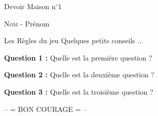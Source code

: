 \documentclass[utf8,a4paper,french,12pt,fleqn]{article}
\newenvironment{Zapf}  {\fontfamily{pzc}\selectfont}{} %
\begin{document}
\begin{center}
\begin{Huge}
Devoir Maison $\text{n}^{\circ}$1 \\
\end{Huge}

\hspace{1cm}

\begin{Large}
\textsc{Nom} - Prénom
\end{Large}
\end{center}

\hspace{3cm}

\begin{bclogo}[logo=\bcbook]{Les Règles du jeu}
Quelques petits conseils ...
\end{bclogo}

\hspace{3cm}

{\large \textbf{Question 1 :}} Quelle est la première question ? \\

\hspace{2cm}

{\large \textbf{Question 2 :}} Quelle est la deuxième question ? \\

\hspace{2cm}

{\large \textbf{Question 3 :}} Quelle est la troisième question ? \\

\hspace{7cm}

		\begin{Zapf} \noindent \centerline{\fontsize{22}{22}\selectfont -- = BON COURAGE = -- } \end{Zapf}
\end{document}
